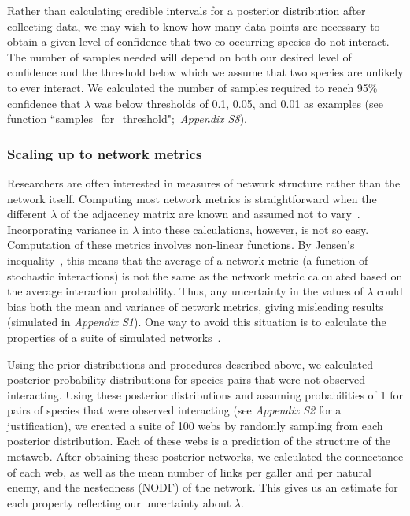 \documentclass[12pt]{article}
\begin{document}
\begin{spacing}{2.0}
        Rather than calculating credible intervals for a posterior distribution after collecting data, we may wish to know how many data points are necessary to obtain a given level of confidence that two co-occurring species do not interact. The number of samples needed will depend on both our desired level of confidence and the threshold below which we assume that two species are unlikely to ever interact. We calculated the number of samples required to reach 95\% confidence that $\lambda$ was below thresholds of 0.1, 0.05, and 0.01 as examples (see function ``samples\_for\_threshold";~\emph{Appendix S8}).


    \subsubsection*{Scaling up to network metrics}

      Researchers are often interested in measures of network structure rather than the network itself. Computing most network metrics is straightforward when the different $\lambda$ of the adjacency matrix are known and assumed not to vary~\citep{Poisot2016}. Incorporating variance in $\lambda$ into these calculations, however, is not so easy. Computation of these metrics involves non-linear functions. By Jensen's inequality~\citep{Jensen1906}, this means that the average of a network metric (a function of stochastic interactions) is not the same as the network metric calculated based on the average interaction probability. Thus, any uncertainty in the values of $\lambda$ could bias both the mean and variance of network metrics, giving misleading results (simulated in \emph{Appendix S1}). One way to avoid this situation is to calculate the properties of a suite of simulated networks~\citep{Vazquez2005,Guimera209}.


      Using the prior distributions and procedures described above, we calculated posterior probability distributions for species pairs that were not observed interacting. Using these posterior distributions and assuming probabilities of 1 for pairs of species that were observed interacting (see \emph{Appendix S2} for a justification), we created a suite of 100 webs by randomly sampling from each posterior distribution. Each of these webs is a prediction of the structure of the metaweb. After obtaining these posterior networks, we calculated the connectance of each web, as well as the mean number of links per galler and per natural enemy, and the nestedness (NODF) of the network. This gives us an estimate for each property reflecting our uncertainty about $\lambda$.



\end{spacing}
\end{document}

